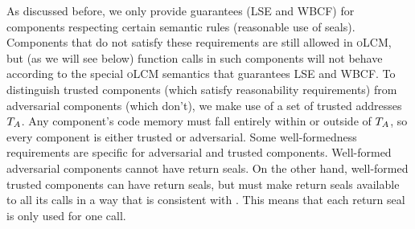 \documentclass[acmsmall,screen]{acmart}\settopmatter{}
\renewcommand{\comp}{\var{comp}}
\newcommand{\wdjud}[2][ ]{#1 \vdash #2}
\newcommand{\srccm}{\textsc{oLCM}}
\newenvironment{jversion}%
    {\color{OliveGreen}}{}
\begin{document}
\begin{jversion}
  As discussed before, we only provide guarantees (LSE and WBCF) for components respecting certain semantic rules (reasonable use of seals).
  Components that do not satisfy these requirements are still allowed in \srccm{}, but (as we will see below) function calls in such components will not behave according to the special \srccm{} semantics that guarantees LSE and WBCF.
  To distinguish trusted components (which satisfy reasonability requirements) from adversarial components (which don't), we make use of a set of trusted addresses $T_{A}$.
  Any component's code memory must fall entirely within or outside of $T_{A}$, so every component is either trusted or adversarial.
  Some well-formedness requirements are specific for adversarial and trusted components.
  Well-formed adversarial components cannot have return seals.
  On the other hand, well-formed trusted components can have return seals, but must make return seals available to all its calls in a way that is consistent with \stktokens{}.
  This means that each return seal is only used for one call.
\end{jversion}

\end{document}
